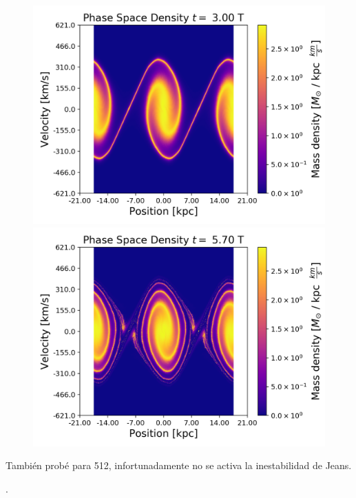 \documentclass[notitlepage,letterpaper,12pt]{article} %
\begin{document}
\begin{figure}[h]
         \includegraphics[scale= 0.5]{y1024phase30.png}
            \includegraphics[scale= 0.5]{y1024phase57.png}
  \label{fig: cobre}
\end{figure}	

También probé para 512, infortunadamente no se activa la inestabilidad de Jeans.

                      
\newpage





.
\end{document}
